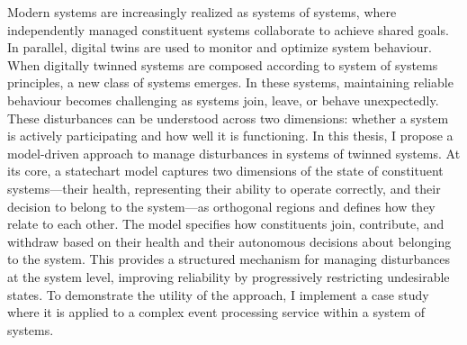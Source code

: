 Modern systems are increasingly realized as systems of systems, where independently managed constituent systems collaborate to achieve shared goals. In parallel, digital twins are used to monitor and optimize system behaviour. When digitally twinned systems are composed according to system of systems principles, a new class of systems emerges. In these systems, maintaining reliable behaviour becomes challenging as systems join, leave, or behave unexpectedly. These disturbances can be understood across two dimensions: whether a system is actively participating and how well it is functioning. In this thesis, I propose a model-driven approach to manage disturbances in systems of twinned systems. At its core, a statechart model captures two dimensions of the state of constituent systems---their health, representing their ability to operate correctly, and their decision to belong to the system---as orthogonal regions and defines how they relate to each other. The model specifies how constituents join, contribute, and withdraw based on their health and their autonomous decisions about belonging to the system. This provides a structured mechanism for managing disturbances at the system level, improving reliability by progressively restricting undesirable states. To demonstrate the utility of the approach, I implement a case study where it is applied to a complex event processing service within a system of systems.